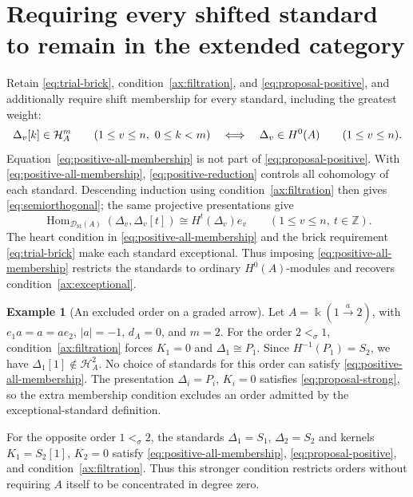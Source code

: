 \documentclass[11pt,a4paper]{article}
\newcommand{\D}{\mathcal D}
\renewcommand{\H}{\mathcal H}
\newcommand{\ZZ}{\mathbb{Z}}
\newcommand{\std}{\Delta}
\DeclareMathOperator{\fd}{fd}
\DeclareMathOperator{\Hom}{Hom}
\let\mod\relax
\DeclareMathOperator{\mod}{mod}
\theoremstyle{plain}
\theoremstyle{definition}
\newtheorem{example}[theorem]{Example}
\numberwithin{equation}{section}
\begin{document}
\section{Requiring every shifted standard to remain in the extended category}
\label{sec:proposal-heart}

Retain \eqref{eq:trial-brick}, condition~\ref{ax:filtration}, and
\eqref{eq:proposal-positive}, and additionally require shift membership
for every standard, including the greatest weight:
\begin{equation}\label{eq:positive-all-membership}
 \std_v[k]\in\H_A^m
 \qquad(1\leq v\leq n,\ 0\leq k<m)
 \quad\Longleftrightarrow\quad
 \std_v\in\mod H^0(A)\qquad(1\leq v\leq n).
\end{equation}
Equation~\eqref{eq:positive-all-membership} is not part of
\eqref{eq:proposal-positive}. With
\eqref{eq:positive-all-membership},
\eqref{eq:positive-reduction} controls all cohomology of each
standard. Descending induction using
condition~\ref{ax:filtration} then gives
\eqref{eq:semiorthogonal}; the same projective presentations give
\begin{equation}\label{eq:positive-heart-self-hom}
 \Hom_{\D_{\fd}(A)}(\std_v,\std_v[t])
 \cong H^t(\std_v)e_v
 \qquad(1\leq v\leq n,\ t\in\ZZ).
\end{equation}
The heart condition in \eqref{eq:positive-all-membership} and the
brick requirement \eqref{eq:trial-brick} make each standard
exceptional. Thus imposing \eqref{eq:positive-all-membership}
restricts the standards to ordinary $H^0(A)$-modules and recovers
condition~\ref{ax:exceptional}.


\begin{example}[An excluded order on a graded arrow]
\label{ex:heart-excluded-order}
Let $A=\Bbbk(1\xrightarrow{a}2)$, with $e_1a=a=ae_2$,
$|a|=-1$, $d_A=0$, and $m=2$. For the order $2<_\sigma1$,
condition~\ref{ax:filtration} forces $K_1=0$ and $\std_1\cong P_1$.
Since $H^{-1}(P_1)=S_2$, we have $\std_1[1]\notin\H_A^2$.
No choice of standards for this order can satisfy
\eqref{eq:positive-all-membership}. The presentation
$\std_i=P_i$, $K_i=0$ satisfies \eqref{eq:proposal-strong}, so the
extra membership condition excludes an order admitted by the
exceptional-standard definition.

For the opposite order $1<_\sigma2$, the standards
$\std_1=S_1$, $\std_2=S_2$ and kernels $K_1=S_2[1]$, $K_2=0$
satisfy \eqref{eq:positive-all-membership},
\eqref{eq:proposal-positive}, and condition~\ref{ax:filtration}.
Thus this stronger condition restricts orders without requiring
$A$ itself to be concentrated in degree zero.
\end{example}
\end{document}
